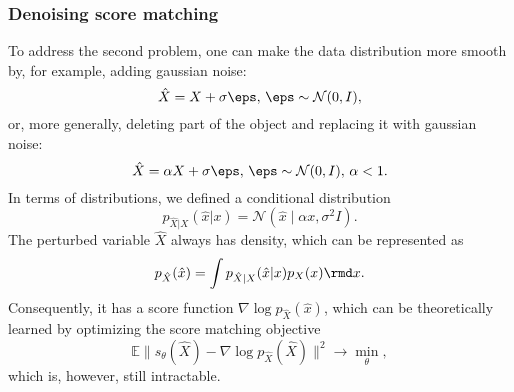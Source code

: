 \subsubsection{Denoising score matching}\label{sec:score_matching}
To address the second problem, one can make the data distribution more smooth by, for example, adding gaussian noise:
\[
    \hat{X} = X + \sigma \eps,
    \, \eps \sim \mathcal{N}(0, I),
\]
or, more generally, deleting part of the object and replacing it with gaussian noise:
\[
    \hat{X} = \alpha X + \sigma \eps, \, \eps \sim \mathcal{N}(0, I), \, \alpha < 1.
\]
In terms of distributions, we defined a conditional distribution
\[
    p_{\hat{X} | X}(\hat{x} | x) = \mathcal{N}(\hat{x} \mid \alpha x, \sigma^2 I).
\]
The perturbed variable $\hat{X}$ always has density, which can be represented as
\begin{equation}\label{eq:total_density}
    p_{\hat{X}}(\hat{x}) = \int p_{\hat{X} | X}(\hat{x} | x)p_{X}(x) \rmd x.    
\end{equation}
Consequently, it has a score function $\nabla \log p_{\hat{X}}(\hat{x})$, which can be theoretically learned by optimizing the score matching objective
\[
    \mathbb{E}\| s_\theta(\hat{X}) - \nabla \log p_{\hat{X}}(\hat{X}) \|^2 \rightarrow \min\limits_{\theta},
\]
which is, however, still intractable.

